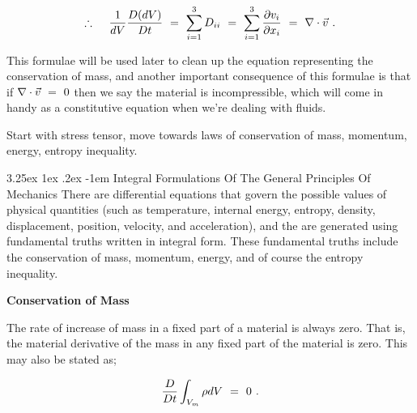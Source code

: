 \documentclass{article}
\makeatletter
\newcounter{subsubsubsection}[subsubsection]
\renewcommand\subparagraph{\@startsection{subparagraph}{6}{\parindent}%
  {3.25ex \@plus1ex \@minus .2ex}%
  {-1em}%
  {\normalfont\normalsize\bfseries}}
\makeatother
\begin{document}
\begin{equation} \label{eb-eq-1-122}
\therefore \hspace{0.425cm} \frac{1}{dV} \frac{D ( dV )}{D t} \hspace{0.125cm} = \hspace{0.125cm} \sum_{i = 1}^{3} D_{i i} \hspace{0.125cm} = \hspace{0.125cm} \sum_{i = 1}^{3} \frac{\partial{v_i}}{\partial{x_i}} \hspace{0.125cm} = \hspace{0.125cm} \nabla \cdot \vec{v} \hspace{0.125cm} . 
\end{equation} 

This formulae will be used later to clean up the equation representing the conservation of mass, and another important consequence of this formulae is that if \begin{math} \nabla \cdot \vec{v} \hspace{0.125cm} = \hspace{0.125cm} 0 \end{math} then we say the material is incompressible, which will come in handy as a constitutive equation when we're dealing with fluids. 

Start with stress tensor, move towards laws of conservation of mass, momentum, energy, entropy inequality. 

\subparagraph{Integral Formulations Of The General Principles Of Mechanics}
There are differential equations that govern the possible values of physical quantities (such as temperature, internal energy, entropy, density, displacement, position, velocity, and acceleration), and the are generated using fundamental truths written in integral form. These fundamental truths include the conservation of mass, momentum, energy, and of course the entropy inequality.

\vspace{0.5cm}

\textbf{Conservation of Mass}
 
The rate of increase of mass in a fixed part of a material is always zero. That is, the material derivative of the mass in any fixed part of the material is zero. This may also be stated as;

\begin{equation} \label{eb-eq-1-123}
\frac{D}{D t} \int_{V_m} \rho dV \hspace{0.125cm} = \hspace{0.125cm} 0 \hspace{0.125cm}  . 
\end{equation} 
\end{document}
